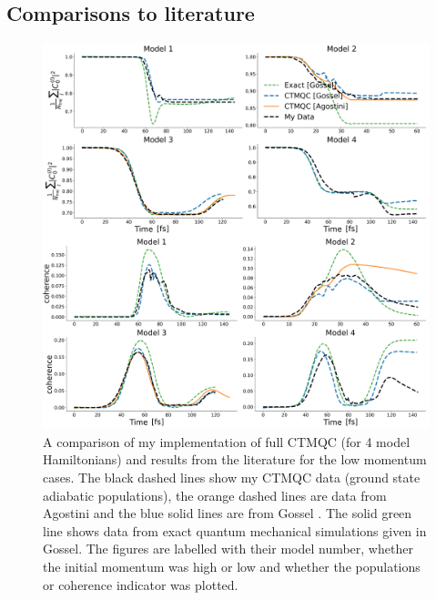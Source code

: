 \subsection{Comparisons to literature}
\begin{figure}[ht]
	\includegraphics[width=\textwidth]{../img/CTMQC/TullyModels/CTMQC_lowMom.png}
	\caption{\label{fig:LitCompCTMQCTullyLow}A comparison of my implementation of full CTMQC (for 4 model Hamiltonians) and results from the literature for the low momentum cases. The black dashed lines show my CTMQC data (ground state adiabatic populations), the orange dashed lines are data from Agostini \cite{agostini_quantum-classical_2016} and the blue solid lines are from Gossel \cite{gossel_coupled-trajectory_2018}. The solid green line shows data from exact quantum mechanical simulations given in Gossel. The figures are labelled with their model number, whether the initial momentum was high or low and whether the populations or coherence indicator was plotted.}
\end{figure}
